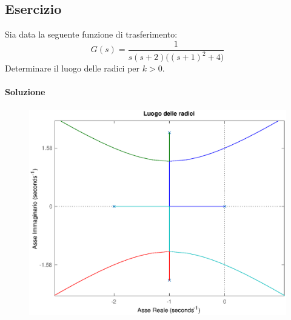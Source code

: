 \subsection{Esercizio}
Sia data la seguente funzione di trasferimento:
\[
	G(s) = \frac{1}{s(s+2)\bigl( (s+1)^2 +4 \bigr)}
\]
Determinare il luogo delle radici per \(k>0\).

\paragraph{Soluzione}

\begin{figure}[ht]
	\centering
	\includegraphics[scale=.6]{mod1/assets/rl_ex37}
\end{figure}

